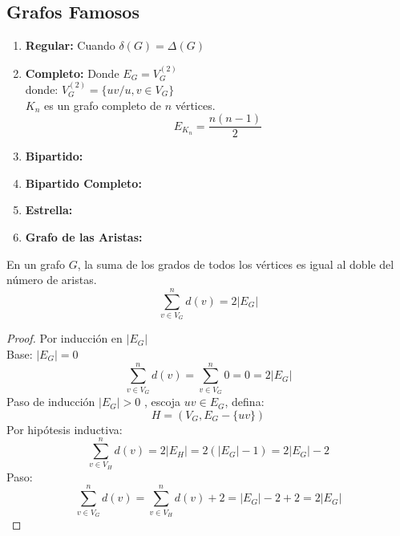 \subsection{Grafos Famosos}
\begin{enumerate}
\item {\bf Regular:} Cuando $\delta(G)=\Delta(G)$
\item {\bf Completo:} Donde $E_G=V_G^{(2)}$ \\
donde: $V_G^{(2)}=\{uv/u,v \in V_G\}$ \\
\notacion $K_n$ es un grafo completo de $n$ vértices.
$$E_{K_n}=\frac{n(n-1)}{2}$$


\item {\bf Bipartido:}


\item {\bf Bipartido Completo:}


\item {\bf Estrella:}


\item {\bf Grafo de las Aristas:}


\end{enumerate}
\begin{teorema}
\label{teoconex}
En un grafo $G$, la suma de los grados de todos los vértices es igual
al doble del número de aristas.
$$\sum_{v\in {V_G}}^n{d(v)} = {2|E_G|}$$
\end{teorema}
\begin{proof}
Por inducción en $|E_G|$ \\
Base: $|E_G|=0$
$$\sum_{v\in {V_G}}^n{d(v)} = \sum_{v\in {V_G}}^n0 = 0 = 2|E_G|$$
Paso de inducción $|E_G|>0$ , escoja $uv \in E_G$, defina: 
$$H=(V_G,E_G-\{uv\})$$
Por hipótesis inductiva:
$$\sum_{v\in {V_H}}^n{d(v)} = 2|E_H| = 2(|E_G|-1) = 2|E_G|-2$$
Paso:
$$\sum_{v\in {V_G}}^n{d(v)} = \sum_{v\in {V_H}}^n{d(v)}+2 = |E_G|-2+2 = 2|E_G|$$
\end{proof}

